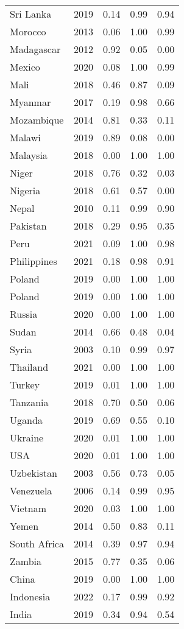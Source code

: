 \begin{longtable}[t]{lrrrr}
Sri Lanka & 2019 & 0.14 & 0.99 & 0.94\\
Morocco & 2013 & 0.06 & 1.00 & 0.99\\
Madagascar & 2012 & 0.92 & 0.05 & 0.00\\
Mexico & 2020 & 0.08 & 1.00 & 0.99\\
Mali & 2018 & 0.46 & 0.87 & 0.09\\
Myanmar & 2017 & 0.19 & 0.98 & 0.66\\
Mozambique & 2014 & 0.81 & 0.33 & 0.11\\
Malawi & 2019 & 0.89 & 0.08 & 0.00\\
Malaysia & 2018 & 0.00 & 1.00 & 1.00\\
Niger & 2018 & 0.76 & 0.32 & 0.03\\
Nigeria & 2018 & 0.61 & 0.57 & 0.00\\
Nepal & 2010 & 0.11 & 0.99 & 0.90\\
Pakistan & 2018 & 0.29 & 0.95 & 0.35\\
Peru & 2021 & 0.09 & 1.00 & 0.98\\
Philippines & 2021 & 0.18 & 0.98 & 0.91\\
Poland & 2019 & 0.00 & 1.00 & 1.00\\
Poland & 2019 & 0.00 & 1.00 & 1.00\\
Russia & 2020 & 0.00 & 1.00 & 1.00\\
Sudan & 2014 & 0.66 & 0.48 & 0.04\\
Syria & 2003 & 0.10 & 0.99 & 0.97\\
Thailand & 2021 & 0.00 & 1.00 & 1.00\\
Turkey & 2019 & 0.01 & 1.00 & 1.00\\
Tanzania & 2018 & 0.70 & 0.50 & 0.06\\
Uganda & 2019 & 0.69 & 0.55 & 0.10\\
Ukraine & 2020 & 0.01 & 1.00 & 1.00\\
USA & 2020 & 0.01 & 1.00 & 1.00\\
Uzbekistan & 2003 & 0.56 & 0.73 & 0.05\\
Venezuela & 2006 & 0.14 & 0.99 & 0.95\\
Vietnam & 2020 & 0.03 & 1.00 & 1.00\\
Yemen & 2014 & 0.50 & 0.83 & 0.11\\
South Africa & 2014 & 0.39 & 0.97 & 0.94\\
Zambia & 2015 & 0.77 & 0.35 & 0.06\\
China & 2019 & 0.00 & 1.00 & 1.00\\
Indonesia & 2022 & 0.17 & 0.99 & 0.92\\
India & 2019 & 0.34 & 0.94 & 0.54\\
\bottomrule
\end{longtable}